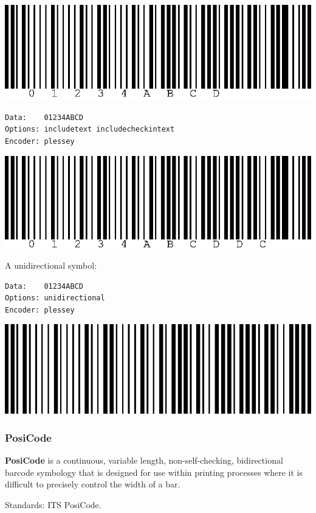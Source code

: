 \includegraphics{images/plessey-1.eps}

\begin{verbatim}
Data:    01234ABCD
Options: includetext includecheckintext
Encoder: plessey
\end{verbatim}

\includegraphics{images/plessey-2.eps}

A unidirectional symbol:

\begin{verbatim}
Data:    01234ABCD
Options: unidirectional
Encoder: plessey
\end{verbatim}

\includegraphics{images/plessey-3.eps}

\hypertarget{posicode}{%
\subsubsection{PosiCode}\label{posicode}}

\textbf{PosiCode} is a continuous, variable length, non-self-checking,
bidirectional barcode symbology that is designed for use within printing
processes where it is difficult to precisely control the width of a bar.

Standards: ITS PosiCode.

